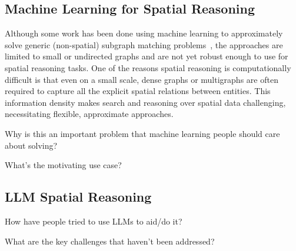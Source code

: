 \subsection{Machine Learning for Spatial Reasoning}
Although some work has been done using machine learning to approximately solve generic (non-spatial) subgraph matching problems~\cite{Krlevza2016, Liu2020Neural,Lan2021,Roy2022}, the approaches are limited to small or undirected graphs and are not yet robust enough to use for spatial reasoning tasks.
One of the reasons spatial reasoning is computationally difficult is that even on a small scale, dense graphs or multigraphs are often required to capture all the explicit spatial relations between entities.
This information density makes search and reasoning over spatial data challenging, necessitating flexible, approximate approaches.

Why is this an important problem that machine learning people should care about solving?

What's the motivating use case?




\subsection{LLM Spatial Reasoning}
How have people tried to use LLMs to aid/do it?

What are the key challenges that haven't been addressed?
